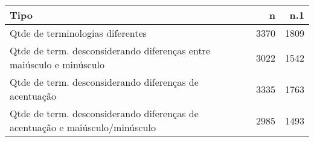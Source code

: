 \begin{table}[ht]
\centering
\begin{tabular}{lrr}
  \hline
Tipo & n & n.1 \\ 
  \hline
Qtde de terminologias diferentes & 3370 & 1809 \\ 
  Qtde de term. desconsiderando diferenças entre maiúsculo e minúsculo & 3022 & 1542 \\ 
  Qtde de term. desconsiderando diferenças de acentuação & 3335 & 1763 \\ 
  Qtde de term. desconsiderando diferenças de acentuação e
          maiúsculo/minúsculo & 2985 & 1493 \\ 
   \hline
\end{tabular}
\end{table}
